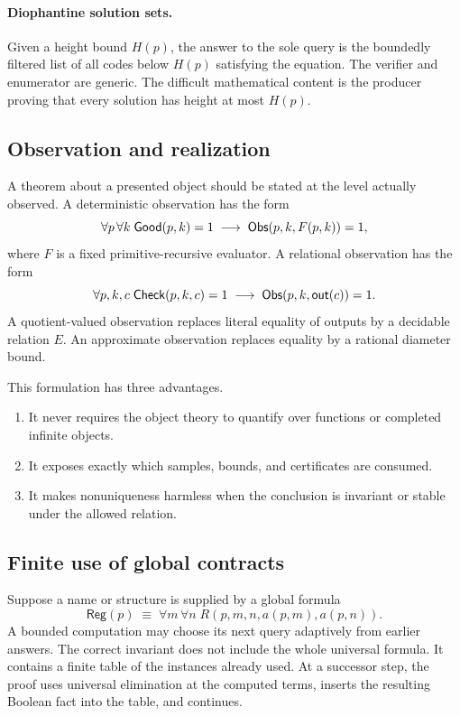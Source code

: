 \paragraph{Diophantine solution sets.}
Given a height bound \(H(p)\), the answer to the sole query is the boundedly filtered list of all codes below \(H(p)\) satisfying the equation.  The verifier and enumerator are generic.  The difficult mathematical content is the producer proving that every solution has height at most \(H(p)\).

\subsection{Observation and realization}

A theorem about a presented object should be stated at the level actually observed.  A deterministic observation has the form
\[
  \forall p\,\forall k\; \mathsf{Good}(p,k)=1\;\longrightarrow\;
  \mathsf{Obs}(p,k,F(p,k))=1,
\]
where \(F\) is a fixed primitive-recursive evaluator.  A relational observation has the form
\[
  \forall p,k,c\; \mathsf{Check}(p,k,c)=1\;\longrightarrow\;
  \mathsf{Obs}(p,k,\mathsf{out}(c))=1.
\]
A quotient-valued observation replaces literal equality of outputs by a decidable relation \(E\).  An approximate observation replaces equality by a rational diameter bound.

This formulation has three advantages.

\begin{enumerate}
\item It never requires the object theory to quantify over functions or completed infinite objects.
\item It exposes exactly which samples, bounds, and certificates are consumed.
\item It makes nonuniqueness harmless when the conclusion is invariant or stable under the allowed relation.
\end{enumerate}

\subsection{Finite use of global contracts}

Suppose a name or structure is supplied by a global formula
\[
  \mathsf{Reg}(p)\;\equiv\;\forall m\,\forall n\;R(p,m,n,a(p,m),a(p,n)).
\]
A bounded computation may choose its next query adaptively from earlier answers.  The correct invariant does not include the whole universal formula.  It contains a finite table of the instances already used.  At a successor step, the proof uses universal elimination at the computed terms, inserts the resulting Boolean fact into the table, and continues.


